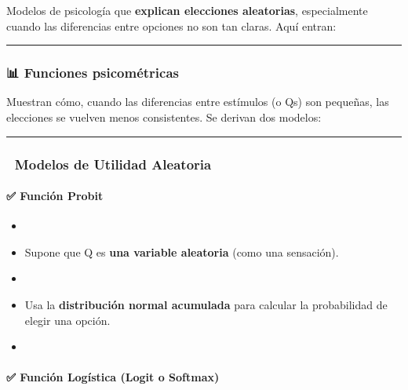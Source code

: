 \documentclass[
  letterpaper,
  DIV=11,
  numbers=noendperiod]{scrartcl}
\let\oldparagraph\paragraph
\renewcommand{\paragraph}[1]{\oldparagraph{#1}\mbox{}}
\begin{document}
Modelos de psicología que \textbf{explican elecciones aleatorias},
especialmente cuando las diferencias entre opciones no son tan claras.
Aquí entran:

\begin{center}\rule{0.5\linewidth}{0.5pt}\end{center}

\hypertarget{funciones-psicomuxe9tricas}{%
\subsubsection{\texorpdfstring{📊 \textbf{Funciones
psicométricas}}{📊 Funciones psicométricas}}\label{funciones-psicomuxe9tricas}}

Muestran cómo, cuando las diferencias entre estímulos (o Qs) son
pequeñas, las elecciones se vuelven menos consistentes. Se derivan dos
modelos:

\begin{center}\rule{0.5\linewidth}{0.5pt}\end{center}

\hypertarget{modelos-de-utilidad-aleatoria}{%
\subsubsection{\texorpdfstring{🧩 \textbf{Modelos de Utilidad
Aleatoria}}{🧩 Modelos de Utilidad Aleatoria}}\label{modelos-de-utilidad-aleatoria}}

\hypertarget{funciuxf3n-probit}{%
\paragraph{\texorpdfstring{✅ \textbf{Función
Probit}}{✅ Función Probit}}\label{funciuxf3n-probit}}

\begin{itemize}
\item
\item
  Supone que Q es \textbf{una variable aleatoria} (como una sensación).
\item
\item
  Usa la \textbf{distribución normal acumulada} para calcular la
  probabilidad de elegir una opción.
\item
\end{itemize}

\hypertarget{funciuxf3n-loguxedstica-logit-o-softmax}{%
\paragraph{\texorpdfstring{✅ \textbf{Función Logística (Logit o
Softmax)}}{✅ Función Logística (Logit o Softmax)}}\label{funciuxf3n-loguxedstica-logit-o-softmax}}
\end{document}
